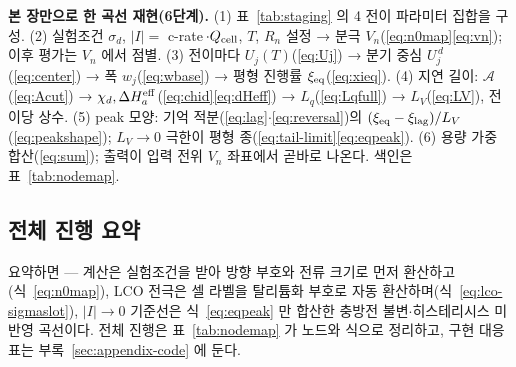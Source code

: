 \begin{keybox}
\textbf{본 장만으로 한 곡선 재현(6단계).}
(1) 표~\ref{tab:staging} 의 4 전이 파라미터 집합을 구성.
(2) 실험조건 $\sigma_d$, $|I|=$ c-rate$\,\cdot Q_{\mathrm{cell}}$, $T$, $R_n$ 설정 → 분극 $V_n$(\eqref{eq:n0map}\eqref{eq:vn}); 이후 평가는 $V_n$ 에서 점별.
(3) 전이마다 $U_j(T)$(\eqref{eq:Uj}) → 분기 중심 $U_j^{\,d}$(\eqref{eq:center}) → 폭 $w_j$(\eqref{eq:wbase}) → 평형 진행률 $\xi_{\mathrm{eq}}$(\eqref{eq:xieq}).
(4) 지연 길이: $\mathcal A$(\eqref{eq:Acut}) → $\chi_d,\Delta H_a^{\mathrm{eff}}$(\eqref{eq:chid}\eqref{eq:dHeff}) → $L_q$(\eqref{eq:Lqfull}) → $L_V$(\eqref{eq:LV}), 전이당 상수.
(5) peak 모양: 기억 적분(\eqref{eq:lag}$\cdot$\eqref{eq:reversal})의 $(\xi_{\mathrm{eq}}-\xi_\mathrm{lag})/L_V$(\eqref{eq:peakshape}); $L_V\to0$ 극한이 평형 종(\eqref{eq:tail-limit}\eqref{eq:eqpeak}).
(6) 용량 가중 합산(\eqref{eq:sum}); 출력이 입력 전위 $V_n$ 좌표에서 곧바로 나온다. 색인은 표~\ref{tab:nodemap}.
\end{keybox}

\subsection{전체 진행 요약}\label{sec:facade}
요약하면 --- 계산은 실험조건을 받아 방향 부호와 전류 크기로 먼저 환산하고(식~\eqref{eq:n0map}),
LCO 전극은 셀 라벨을 탈리튬화 부호로 자동 환산하며(식~\eqref{eq:lco-sigmaslot}), $|I|\to0$ 기준선은
식~\eqref{eq:eqpeak} 만 합산한 충방전 불변$\cdot$히스테리시스 미반영 곡선이다. 전체 진행은
표~\ref{tab:nodemap} 가 노드와 식으로 정리하고, 구현 대응표는
부록~\ref{sec:appendix-code} 에 둔다.

